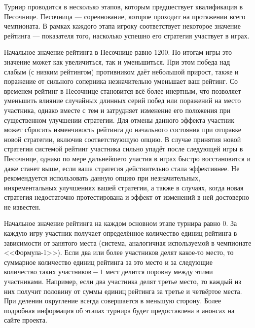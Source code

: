 Турнир проводится в несколько этапов, которым предшествует квалификация в Песочнице. Песочница --- соревнование, которое проходит на
протяжении всего чемпионата. В рамках каждого этапа игроку соответствует некоторое значение рейтинга --- показателя того, насколько успешно
его стратегия участвует в играх.

Начальное значение рейтинга в Песочнице равно $1200$. По итогам игры это значение может как увеличиться, так и уменьшиться. При этом победа
над слабым (с низким рейтингом) противником даёт небольшой прирост, также и поражение от сильного соперника незначительно уменьшает ваш
рейтинг. Со временем рейтинг в Песочнице становится всё более инертным, что позволяет уменьшить влияние случайных длинных серий побед или
поражений на место участника, однако вместе с тем и затрудняет изменение его положения при существенном улучшении стратегии. Для отмены
данного эффекта участник может сбросить изменчивость рейтинга до начального состояния при отправке новой стратегии, включив соответствующую
опцию. В случае принятия новой стратегии системой рейтинг участника сильно упадёт после следующей игры в Песочнице, однако по мере
дальнейшего участия в играх быстро восстановится и даже станет выше, если ваша стратегия действительно стала эффективнее. Не рекомендуется
использовать данную опцию при незначительных, инкрементальных улучшениях вашей стратегии, а также в случаях, когда новая стратегия
недостаточно протестирована и эффект от изменений в ней достоверно не известен.

Начальное значение рейтинга на каждом основном этапе турнира равно $0$. За каждую игру участник получает определённое количество единиц
рейтинга в зависимости от занятого места (система, аналогичная используемой в чемпионате <<Формула-1>>). Если два или более участников делят
какое-то место, то суммарное количество единиц рейтинга за это место и за следующие $\texttt{количество\_таких\_участников}-1$ мест делится
поровну между этими участниками. Например, если два участника делят третье место, то каждый из них получит половину от суммы единиц рейтинга
за третье и четвёртое места. При делении округление всегда совершается в меньшую сторону. Более подробная информация об этапах турнира будет
предоставлена в анонсах на сайте проекта.

